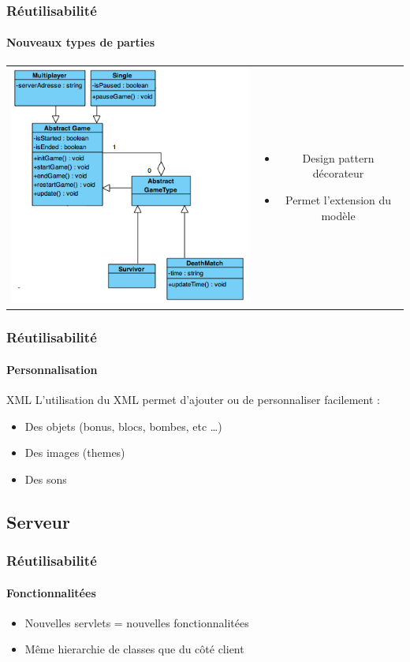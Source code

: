 	\begin{frame}
	\frametitle{Réutilisabilité}
	\framesubtitle{Nouveaux types de parties}

	
	\begin{tabular}{cc}
	\begin{minipage}{5cm}
		\includegraphics[scale=0.4]{img/decorateur.png} 
	\end{minipage}
	&
	\begin{minipage}{5cm}
	\begin{itemize} 
		\item Design pattern décorateur
		\item Permet l'extension du modèle
	\end{itemize} 
	\end{minipage}
	\end{tabular}
	
	\end{frame}
	

	\begin{frame}
	\frametitle{Réutilisabilité}
	\framesubtitle{Personnalisation}
	
		XML
			L'utilisation du XML permet d'ajouter ou de personnaliser facilement :
			\begin{itemize}
				\item Des objets (bonus, blocs, bombes, etc \ldots)
				\item Des images (themes)
				\item Des sons
			\end{itemize}
	\end{frame}
	

\subsection{Serveur}

	\begin{frame}
	\frametitle{Réutilisabilité}
	\framesubtitle{Fonctionnalitées}
	
		\begin{itemize}
			\item Nouvelles servlets = nouvelles fonctionnalitées
			\item Même hierarchie de classes que du côté client 
		\end{itemize}
		
	\end{frame}